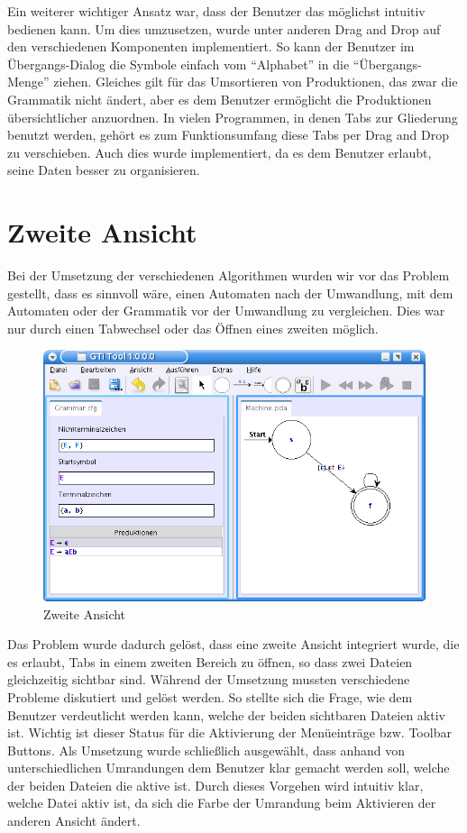 Ein weiterer wichtiger Ansatz war, dass der Benutzer das \gtitool möglichst
intuitiv bedienen kann. Um dies umzusetzen, wurde unter anderen Drag and Drop
auf den verschiedenen Komponenten implementiert. So kann der Benutzer im
Übergangs-Dialog die Symbole einfach vom "`Alphabet"' in die
"`Übergangs-Menge"' ziehen. Gleiches gilt für das Umsortieren von Produktionen,
das zwar die Grammatik nicht ändert, aber es dem Benutzer ermöglicht die
Produktionen übersichtlicher anzuordnen. In vielen Programmen, in denen Tabs
zur Gliederung benutzt werden, gehört es zum Funktionsumfang diese Tabs per Drag
and Drop zu verschieben. Auch dies wurde implementiert, da es dem Benutzer
erlaubt, seine Daten besser zu organisieren.


\section{Zweite Ansicht}\label{SecondView}

Bei der Umsetzung der verschiedenen Algorithmen wurden wir vor das Problem
gestellt, dass es sinnvoll wäre, einen Automaten nach der Umwandlung, mit dem
Automaten oder der Grammatik vor der Umwandlung zu vergleichen. Dies war nur
durch einen Tabwechsel oder das Öffnen eines zweiten \gtitools
möglich.\vspace{10pt}

\begin{figure}[h!]
\begin{center}
\includegraphics[width=12cm]{../images/second_view.png}
\caption{Zweite Ansicht}
\end{center}
\end{figure}

Das Problem wurde dadurch gelöst, dass eine zweite Ansicht integriert wurde,
die es erlaubt, Tabs in einem zweiten Bereich zu öffnen, so dass zwei Dateien
gleichzeitig sichtbar sind. Während der Umsetzung mussten verschiedene Probleme
diskutiert und gelöst werden. So stellte sich die Frage, wie dem Benutzer
verdeutlicht werden kann, welche der beiden sichtbaren Dateien aktiv ist.
Wichtig ist dieser Status für die Aktivierung der Menüeinträge bzw. Toolbar
Buttons. Als Umsetzung wurde schließlich ausgewählt, dass anhand von
unterschiedlichen Umrandungen dem Benutzer klar gemacht werden soll, welche der
beiden Dateien die aktive ist. Durch dieses Vorgehen wird intuitiv klar, welche
Datei aktiv ist, da sich die Farbe der Umrandung beim Aktivieren der anderen
Ansicht ändert.\vspace{10pt}

